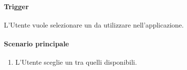 \paragraph*{Trigger}
L'Utente vuole selezionare un  da utilizzare nell'applicazione.

\paragraph*{Scenario principale}
\begin{enumerate}
  \item L'Utente sceglie un  tra quelli disponibili.
\end{enumerate}

